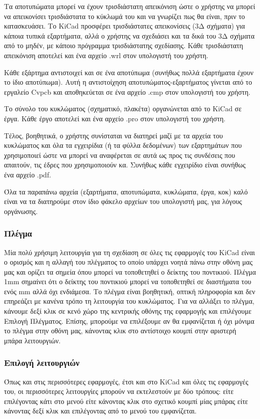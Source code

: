 \documentclass[a4paper]{article}
\begin{document}
Τα αποτυπώματα μπορεί να έχουν τρισδιάστατη απεικόνιση ώστε ο χρήστης να μπορεί να απεικονίσει τρισδιάστατα το κύκλωμά του και να γνωρίζει πως θα είναι, πριν το κατασκευάσει. Το \textenglish{KiCad} προσφέρει τρισδιάστατες απεικονίσεις (3Δ σχήματα) για κάποια τυπικά εξαρτήματα, αλλά ο χρήστης να σχεδιάσει και τα δικά του 3Δ σχήματα από το μηδέν, με κάποιο πρόγραμμα τρισδιάστατης σχεδίασης. Κάθε τρισδιάστατη απεικόνιση αποτελεί και ένα αρχείο .wrl στον υπολογιστή του χρήστη. 

Κάθε εξάρτημα αντιστοιχεί και σε ένα αποτύπωμα (συνήθως πολλά εξαρτήματα έχουν το ίδιο αποτύπωμα). Αυτή η αντιστοίχηση αποτυπώματος-εξαρτήματος γίνεται από το εργαλείο \textenglish{Cvpcb} και αποθηκεύεται σε ένα αρχείο .cmp στον υπολογιστή του χρήστη. 

Το σύνολο του κυκλώματος (σχηματικό, πλακέτα) οργανώνεται από το \textenglish{KiCad} σε έργα. Κάθε έργο αποτελεί και ένα αρχείο .pro στον υπολογιστή του χρήστη. 

Τέλος, βοηθητικά, ο χρήστης συνίσταται να διατηρεί μαζί με τα αρχεία του κυκλώματος και όλα τα εγχειρίδια (ή τα φύλλα δεδομένων) των εξαρτημάτων που χρησιμοποιεί ώστε να μπορεί να αναφέρεται σε αυτά ως προς τις συνδέσεις που απαιτούν, τις έδρες που χρησιμοποιούν κα. Συνήθως κάθε εγχειρίδιο είναι συνήθως ένα αρχείο .pdf.

Όλα τα παραπάνω αρχεία (εξαρτήματα, αποτυπώματα, κυκλώματα, έργα, κοκ) καλό είναι να τα διατηρούμε στον ίδιο φάκελο αρχείων του υπολογιστή μας, για λόγους οργάνωσης.  

\subsubsection{Πλέγμα}
Mία πολύ χρήσιμη λειτουργία για τη σχεδίαση σε όλες τις εφαρμογές του \textenglish{KiCad} είναι ο ορισμός και η αλλαγή του πλέγματος το οποίο υπάρχει νοητά πάνω στην οθόνη μας μας και ορίζει τα σημεία όπου μπορεί να τοποθετηθεί ο δείκτης του ποντικιού. Πλέγμα 1mm σημαίνει ότι ο δείκτης του ποντικιού μπορεί να τοποθετηθεί σε διαστήματα του ενός mm αλλά όχι ενδιάμεσα. Το πλέγμα είναι βοηθητική, οπτική πληροφορία και δεν επηρεάζει με κανένα τρόπο τη λειτουργία του κυκλώματος. Για να αλλάξει το πλέγμα, κάνουμε δεξί κλικ σε κενό χώρο της κεντρικής οθόνης της εφαρμογής και επιλέγουμε Επιλογή Πλέγματος. Επίσης, μπορούμε να επιλέξουμε αν θα εμφανίζεται ή όχι μόνιμα το πλέγμα στην οθόνη μας, κάνοντας κλικ στο αντίστοιχο κουμπί στην αριστερή μπάρα λειτουργιών.

\subsubsection{Επιλογή λειτουργιών}
Όπως και στις περισσότερες εφαρμογές, έτσι και στο \textenglish{KiCad} και όλες τις εφαρμογές του, οι περισσότερες λειτουργίες μπορούν να εκτελεστούν με δύο τρόπους: είτε επιλέγοντας κάτι στο μενού είτε κάνοντας κλικ στο σχετικό κουμπί μίας μπάρας είτε κάνοντας δεξί κλικ και επιλέγοντας από το μενού του εμφανίζεται.
\end{document}

